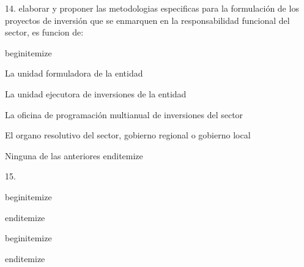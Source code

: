 14. elaborar y proponer las metodologias especificas para la formulación de los proyectos de inversión que se enmarquen en la responsabilidad funcional del sector, es funcion de:

begin{itemize}
			\item La unidad formuladora de la entidad
 			\item La unidad ejecutora de inversiones de la entidad
			\item La oficina de programación multianual de inversiones del sector
			\item El organo resolutivo del sector, gobierno regional o gobierno local
			\item Ninguna de las anteriores 
end{itemize}

15.  

begin{itemize}
			\item
 			\item
			\item
			\item
			\item
end{itemize}



begin{itemize}
			\item
 			\item
			\item
			\item
			\item
end{itemize}



















